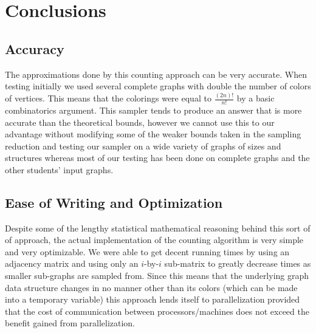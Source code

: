 \documentclass[14]{article}
\begin{document}
\section{Conclusions}
\subsection{Accuracy}
The approximations done by this counting approach can be very accurate. When testing initially we used several complete graphs with double the number of colors of vertices. This means that the colorings were equal to $\frac{(2n)!}{n!}$ by a basic combinatorics argument. This sampler tends to produce an answer that is more accurate than the theoretical bounds, however we cannot use this to our advantage without modifying some of the weaker bounds taken in the sampling reduction and testing our sampler on a wide variety of graphs of sizes and structures whereas most of our testing has been done on complete graphs and the other students' input graphs.
\subsection{Ease of Writing and Optimization}
Despite some of the lengthy statistical mathematical reasoning behind this sort of of approach, the actual implementation of the counting algorithm is very simple and very optimizable. We were able to get decent running times by using an adjacency matrix and using only an $i$-by-$i$ sub-matrix to greatly decrease times as smaller sub-graphs are sampled from. Since this means that the underlying graph data structure changes in no manner other than its colors (which can be made into a temporary variable) this approach lends itself to parallelization provided that the cost of communication between processors/machines does not exceed the benefit gained from parallelization.
\end{document}
